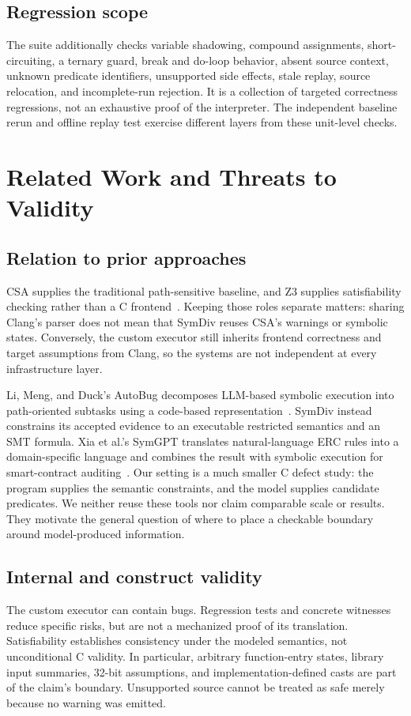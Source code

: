 \documentclass[sigconf]{acmart}
\begin{document}
\subsection{Regression scope}
\RegressionSummary{}
The suite additionally checks variable shadowing, compound assignments,
short-circuiting, a ternary guard, break and do-loop behavior, absent source
context, unknown predicate identifiers, unsupported side effects, stale replay,
source relocation, and incomplete-run rejection. It is a collection of targeted
correctness regressions, not an exhaustive proof of the interpreter. The
independent baseline rerun and offline replay test exercise different layers
from these unit-level checks.

\section{Related Work and Threats to Validity}
\subsection{Relation to prior approaches}
CSA supplies the traditional path-sensitive baseline, and Z3 supplies
satisfiability checking rather than a C frontend~\cite{clang-checkers,z3}.
Keeping those roles separate matters: sharing Clang's parser does not mean
that SymDiv reuses CSA's warnings or symbolic states. Conversely, the custom
executor still inherits frontend correctness and target assumptions from
Clang, so the systems are not independent at every infrastructure layer.

Li, Meng, and Duck's AutoBug decomposes LLM-based symbolic execution into
path-oriented subtasks using a code-based representation~\cite{autobug}.
SymDiv instead constrains its accepted evidence to an executable restricted
semantics and an SMT formula. Xia et al.'s SymGPT translates natural-language
ERC rules into a domain-specific language and combines the result with symbolic
execution for smart-contract auditing~\cite{symgpt}. Our setting is a much
smaller C defect study: the program supplies the semantic constraints, and the
model supplies candidate predicates. We neither reuse these tools nor claim
comparable scale or results. They motivate the general question of where to
place a checkable boundary around model-produced information.

\subsection{Internal and construct validity}
The custom executor can contain bugs. Regression tests and concrete witnesses
reduce specific risks, but are not a mechanized proof of its translation.
Satisfiability establishes consistency under the modeled semantics, not
unconditional C validity. In particular, arbitrary function-entry states,
library input summaries, 32-bit assumptions, and implementation-defined casts
are part of the claim's boundary. Unsupported source cannot be treated as
safe merely because no warning was emitted.
\end{document}
